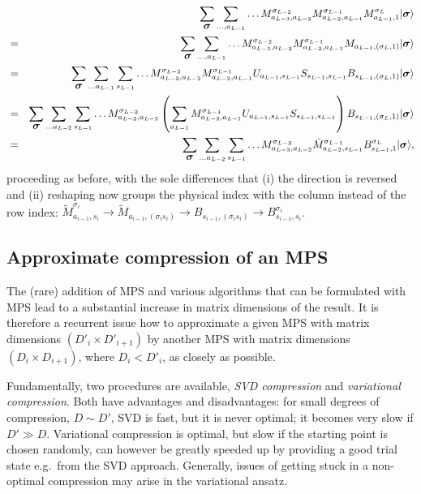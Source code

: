 \documentclass[a4paper,10pt,oneside,onecolumn,1p,times]{elsarticle}
\newcommand{\ket}[1]{\mbox{$| #1  \rangle$}}
\newcommand{\fat}[1]{\mbox{\boldmath$#1$\unboldmath}}	%
\begin{document}
\begin{eqnarray}
& & \sum_{\fat{\sigma}} \sum_{\ldots,a_{L-1}}  \ldots M^{\sigma_{L-2}}_{a_{L-3},a_{L-2}} M^{\sigma_{L-1}}_{a_{L-2},a_{L-1}} M^{\sigma_{L}}_{a_{L-1},1}  \ket{\fat{\sigma}} \nonumber \\
&=& \sum_{\fat{\sigma}} \sum_{\ldots,a_{L-1}}  \ldots M^{\sigma_{L-2}}_{a_{L-3},a_{L-2}} M^{\sigma_{L-1}}_{a_{L-2},a_{L-1}} M_{a_{L-1},(\sigma_{L},1)}  \ket{\fat{\sigma}} \nonumber \\
&=&  \sum_{\fat{\sigma}} \sum_{\ldots a_{L-1}} \sum_{s_{L-1}}  \ldots M^{\sigma_{L-2}}_{a_{L-3},a_{L-2}} M^{\sigma_{L-1}}_{a_{L-2},a_{L-1}} 
U_{a_{L-1},s_{L-1}} S_{s_{L-1},s_{L-1}} B_{s_{L-1},(\sigma_L,1)}   \ket{\fat{\sigma}} \nonumber \\
&=& \sum_{\fat{\sigma}} \sum_{\ldots a_{L-2}} \sum_{s_{L-1}} 
\ldots M^{\sigma_{L-2}}_{a_{L-3},a_{L-2}} \left( \sum_{a_{L-1}} M^{\sigma_{L-1}}_{a_{L-2},a_{L-1}} U_{a_{L-1},s_{L-1}} S_{s_{L-1},s_{L-1}}\right) 
B_{s_{L-1},(\sigma_L,1)}   \ket{\fat{\sigma}} \nonumber \\
&=& \sum_{\fat{\sigma}} \sum_{\ldots a_{L-2}} \sum_{s_{L-1}}
\ldots M^{\sigma_{L-2}}_{a_{L-3},a_{L-2}} \tilde{M}^{\sigma_{L-1}}_{a_{L-2},s_{L-1}} B^{\sigma_L}_{s_{L-1},1}   \ket{\fat{\sigma}} ,
\end{eqnarray}
proceeding as before, with the sole differences that (i) the direction is reversed and (ii) reshaping now groups the physical index with the column instead of the row index: $\tilde{M}^{\sigma_i}_{a_{i-1},s_{i}} \rightarrow \tilde{M}_{a_{i-1},(\sigma_i s_i)} \rightarrow B_{s_{i-1},(\sigma_i s_i)} \rightarrow B^{\sigma_i}_{s_{i-1},s_i}$. 
    
    
\subsection{Approximate compression of an MPS}

The (rare) addition of MPS and various algorithms that can be formulated with MPS lead to a substantial increase in matrix dimensions of the result. It is therefore a recurrent issue how to approximate a given MPS with matrix dimensions $(D'_i \times D'_{i+1})$ by another MPS with 
matrix dimensions $(D_i \times D_{i+1})$, where $D_i < D'_i$, as closely as possible. 

Fundamentally, two procedures are available, {\em SVD compression} and {\em variational compression}. Both have advantages and disadvantages: for small degrees of compression, $D \sim D'$, SVD is fast, but it is never optimal; it becomes very slow if $D' \gg D$. Variational compression is optimal, but slow if the starting point is chosen randomly, can however be greatly speeded up by providing a good trial state e.g.\ from the SVD approach. Generally, issues of getting stuck in a non-optimal compression may arise in the variational ansatz.
 
\end{document}
